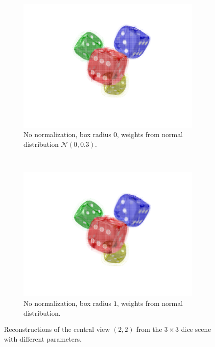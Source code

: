 \documentclass[11pt,a4paper,titlepage]{article}
\begin{document}
\begin{figure}[h]
	\\
	\begin{subfigure}[t]{0.45\textwidth}
		\includegraphics[width=\textwidth]{results/aliasing_fixes/compare_normalization/no_normalization_r=0_weights=gauss/central_view_reconstruction2-2.png} 
		\caption{No normalization, box radius $0$, weights from normal distribution $\mathcal{N}\left(0, 0.3\right)$.}
	\end{subfigure}%
	~
	\begin{subfigure}[t]{0.45\textwidth}
		\includegraphics[width=\textwidth]{results/aliasing_fixes/compare_normalization/no_normalization_r=1_weights=gauss/central_view_reconstruction2-2.png} 
		\caption{No normalization, box radius $1$, weights from normal distribution.}
	\end{subfigure}%

	\caption{Reconstructions of the central view $\left(2, 2\right)$ from the $3 \times 3$ dice scene with different parameters.}
	\label{fig:normalization_impact_comparison}
\end{figure}
\end{document}
